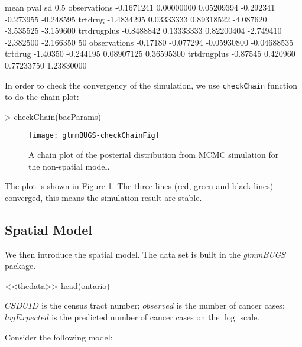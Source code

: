 \documentclass[a4paper]{report}
\begin{document}
\begin{article}
\begin{Schunk}
\begin{Soutput}
                   mean       pval         sd      0.5%      2.5%        5%
observations -0.1671241 0.00000000 0.05209394 -0.292341 -0.273955 -0.248595
trtdrug      -1.4834295 0.03333333 0.89318522 -4.087620 -3.535525 -3.159600
trtdrugplus  -0.8488842 0.13333333 0.82200404 -2.749410 -2.382500 -2.166350
                  50%       95%       97.5%       99.5%
observations -0.17180 -0.077294 -0.05930800 -0.04688535
trtdrug      -1.40350 -0.244195  0.08907125  0.36595300
trtdrugplus  -0.87545  0.420960  0.77233750  1.23830000
\end{Soutput}
\end{Schunk}

In order to check the convergency of the simulation, we use \verb!checkChain! function to do the chain plot:
\begin{Schunk}
\begin{Sinput}
> checkChain(bacParams)
\end{Sinput}
\end{Schunk}

\begin{figure}[ht]
\begin{center}
\texttt{[image: glmmBUGS-checkChainFig]}
 \caption{A chain plot of the posterial distribution from MCMC simulation for the non-spatial model.}\label{chain}
 \end{center}
\end{figure}

The plot is shown in Figure \ref{chain}. The three lines (red, green and black lines) converged, this means the simulation result are stable. 



\subsection{Spatial Model} 
We then introduce the spatial model. The data set is built in the \textit{glmmBUGS} package. 

<<thedata>>
head(ontario)

$CSDUID$ is the census tract number; 
$observed$ is the number of cancer cases; 
$logExpected$ is the predicted number of cancer cases on the $\log$ scale.

Consider the following model:


\end{article}
\end{document}
